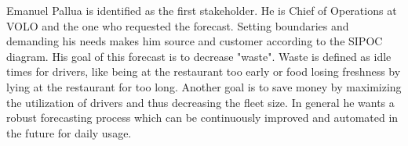\begin{table}[h]
\centering
\caption{SIPOC Diagram derived from the five basic steps}
\label{tab:sipoc}
\end{table}
Emanuel Pallua is identified as the first stakeholder. He is Chief of Operations at VOLO and the one who requested the forecast. Setting boundaries and demanding his needs makes him source and customer according to the SIPOC diagram. His goal of this forecast is to decrease "waste". Waste is defined as idle times for drivers, like being at the restaurant too early or food losing freshness by lying at the restaurant for too long. Another goal is to save money by maximizing the utilization of drivers and thus decreasing the fleet size. In general he wants a robust forecasting process which can be continuously improved and automated in the future for daily usage. \newline
